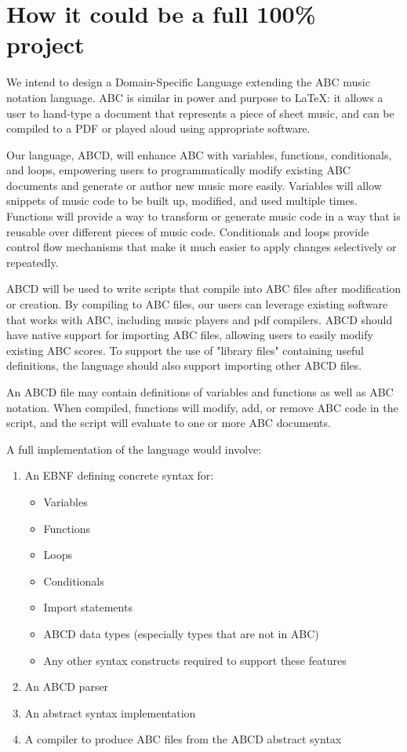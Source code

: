 \section{How it could be a full 100\% project}

We intend to design a Domain-Specific Language extending the ABC music notation language. ABC is similar in power and purpose to \LaTeX: it allows a user to hand-type a document that represents a piece of sheet music, and can be compiled to a PDF or played aloud using appropriate software.

Our language, ABCD, will enhance ABC with variables, functions, conditionals, and loops, empowering users to programmatically modify existing ABC documents and generate or author new music more easily. Variables will allow snippets of music code to be built up, modified, and used multiple times. Functions will provide a way to transform or generate music code in a way that is reusable over different pieces of music code. Conditionals and loops provide control flow mechanisms that make it much easier to apply changes selectively or repeatedly.

ABCD will be used to write scripts that compile into ABC files after modification or creation. By compiling to ABC files, our users can leverage existing software that works with ABC, including music players and pdf compilers. ABCD should have native support for importing ABC files, allowing users to easily modify existing ABC scores. To support the use of "library files" containing useful definitions, the language should also support importing other ABCD files.

An ABCD file may contain definitions of variables and functions as well as ABC notation. When compiled, functions will modify, add, or remove ABC code in the script, and the script will evaluate to one or more ABC documents. 

A full implementation of the language would involve:

\begin{enumerate}
\item An EBNF defining concrete syntax for:
\begin{itemize}
    \item Variables
    \item Functions
    \item Loops
    \item Conditionals
    \item Import statements
    \item ABCD data types (especially types that are not in ABC)
    \item Any other syntax constructs required to support these features
\end{itemize} 
\item An ABCD parser
\item An abstract syntax implementation
\item A compiler to produce ABC files from the ABCD abstract syntax
\end{enumerate}

